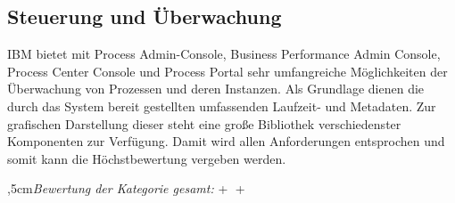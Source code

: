 
\subsection{Steuerung und Überwachung}

IBM bietet mit Process Admin-Console, Business Performance Admin Console, Process Center Console und Process Portal sehr umfangreiche Möglichkeiten der Überwachung von Prozessen und deren Instanzen. Als Grundlage dienen die durch das System bereit gestellten umfassenden Laufzeit- und Metadaten. Zur grafischen Darstellung dieser steht eine große Bibliothek verschiedenster Komponenten zur Verfügung. Damit wird allen Anforderungen entsprochen und somit kann die Höchstbewertung vergeben werden.

\bigskip{},5cm\textit{Bewertung der Kategorie gesamt:} \hspace{5mm} \textcircled{+} \textcircled{+}
\leftskip=0cm


